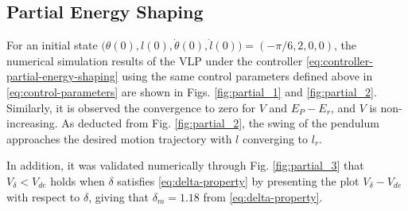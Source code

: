 \documentclass[main.tex]{subfiles}
\begin{document}
\subsection{Partial Energy Shaping}
For an initial state $\big(\theta(0),l(0),\dot{\theta}(0),\dot{l}(0)\big) = (-\pi/6,2,0,0)$, 
the numerical simulation results of the VLP under the controller \eqref{eq:controller-partial-energy-shaping} using the same control parameters defined above in \eqref{eq:control-parameters} are shown in Figs. \ref{fig:partial_1} and \ref{fig:partial_2}. Similarly, it is observed the convergence to zero for $V$ and $E_P-E_r$, and $V$ is non-increasing. As deducted from Fig. \ref{fig:partial_2}, the swing of the pendulum approaches the desired motion trajectory with $l$ converging to $l_r$.

In addition, it was validated numerically through Fig. \ref{fig:partial_3} that $V_{\delta}<V_{de}$ holds when $\delta$ satisfies \eqref{eq:delta-property} by presenting the plot $V_{\delta}-V_{de}$ with respect to $\delta$, giving that $\delta_m = 1.18$ from \eqref{eq:delta-property}. 
\end{document}
